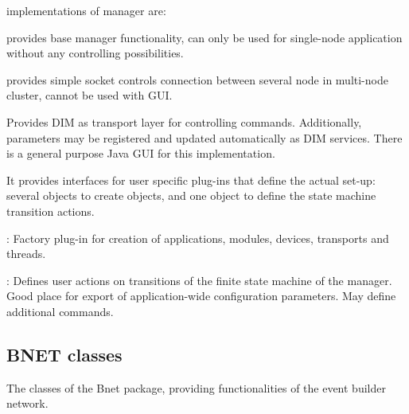 \begin{description}
\begin{compactenum}
      implementations of manager are:
\begin{compactitem}[$\bullet$]
   \item {} provides base manager functionality,
      can only be used for single-node application without any controlling possibilities. 
   \item {} provides simple socket controls connection between
      several node in multi-node cluster, cannot be used with GUI.
   \item {} Provides DIM \cite{DIM} as 
	 transport layer for controlling commands. Additionally, 
	 parameters may be registered and updated automatically as 
	 DIM services. There is a general purpose Java GUI for this implementation. 
\end{compactitem}
      
      \item It provides interfaces for user specific plug-ins that define 
      the actual set-up: \\
      several  objects to create objects, and 
      one  object to define the state machine transition actions.
\end{compactenum}

\item[\class{dabc::Factory}] : 
	Factory plug-in for creation of applications, modules, devices, transports and threads.

\item[\class{dabc::Application}] : 
Defines user actions on transitions of the finite state machine of the manager.
Good place for export of application-wide configuration parameters. 
May define additional commands.
\end{description}




\subsection{BNET classes}
\label{prog_bnet_classes}
The classes of the Bnet package, providing functionalities of the event builder network.



